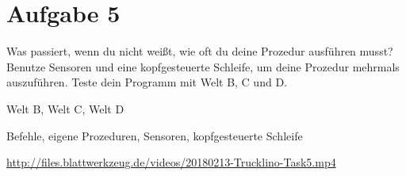 \pagebreak

\section*{Aufgabe 5}
\label{sec:exercises:5}

Was passiert, wenn du nicht weißt, wie oft du deine Prozedur ausführen musst? Benutze Sensoren und eine kopfgesteuerte Schleife, um deine Prozedur mehrmals auszuführen. Teste dein Programm mit Welt B, C und D.

\begin{description}[noitemsep]
  \item[Welt wählen:] Welt B, Welt C, Welt D
  \item[Du brauchst:] Befehle, eigene Prozeduren, Sensoren, kopfgesteuerte Schleife
  \item[Video:] \url{http://files.blattwerkzeug.de/videos/20180213-Trucklino-Task5.mp4}
\end{description}

